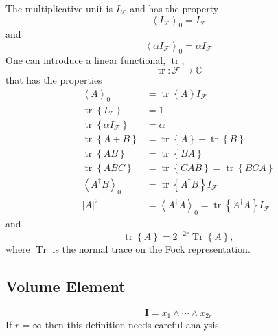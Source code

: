 \documentclass[aps,preprint]{revtex4}%
\begin{document}
The multiplicative unit is $I_{\mathcal{F}}$ and has the property
\begin{equation}
\left\langle I_{\mathcal{F}}\right\rangle _{0}=I_{\mathcal{F}}%
\end{equation}
and
\begin{equation}
\left\langle \alpha I_{\mathcal{F}}\right\rangle _{0}=\alpha I_{\mathcal{F}}%
\end{equation}
One can introduce a linear functional, $\operatorname*{tr},$%
\begin{equation}
\operatorname*{tr}:\mathcal{F\rightarrow}\mathbb{C}%
\end{equation}
that has the properties
\begin{align}
\left\langle A\right\rangle _{0}  &  =\operatorname*{tr}\left\{  A\right\}
I_{\mathcal{F}}\\
\operatorname*{tr}\left\{  I_{\mathcal{F}}\right\}   &  =1\\
\operatorname*{tr}\left\{  \alpha I_{\mathcal{F}}\right\}   &  =\alpha\\
\operatorname*{tr}\left\{  A+B\right\}   &  =\operatorname*{tr}\left\{
A\right\}  +\operatorname*{tr}\left\{  B\right\} \\
\operatorname*{tr}\left\{  AB\right\}   &  =\operatorname*{tr}\left\{
BA\right\} \\
\operatorname*{tr}\left\{  ABC\right\}   &  =\operatorname*{tr}\left\{
CAB\right\}  =\operatorname*{tr}\left\{  BCA\right\} \\
\left\langle A^{\dagger}B\right\rangle _{0}  &  =\operatorname*{tr}\left\{
A^{\dagger}B\right\}  I_{\mathcal{F}}\\
\left\vert A\right\vert ^{2}  &  =\left\langle A^{\dagger}A\right\rangle
_{0}=\operatorname*{tr}\left\{  A^{\dagger}A\right\}  I_{\mathcal{F}}%
\end{align}
and
\begin{equation}
\operatorname*{tr}\left\{  A\right\}  =2^{-2r}\operatorname*{Tr}\left\{
A\right\}  ,
\end{equation}
where $\operatorname*{Tr}$ is the normal trace on the Fock representation.

\subsection{Volume Element}%

\begin{equation}
\mathbf{I}=x_{1}\wedge\cdots\wedge x_{2r}%
\end{equation}
If $r=\infty$ then this definition needs careful analysis.
\end{document}
